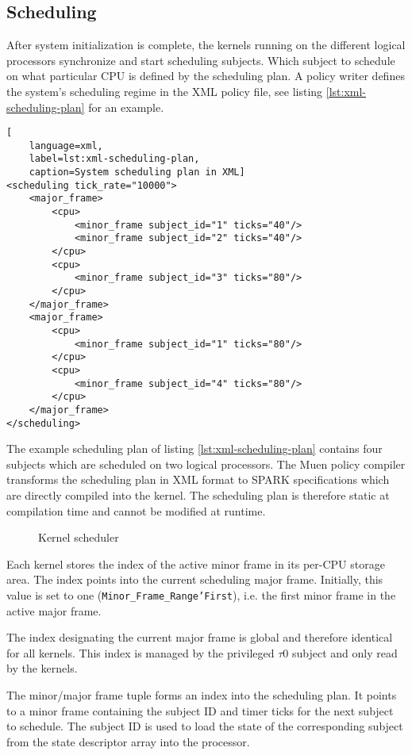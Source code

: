 \subsection{Scheduling}\label{subsec:scheduling}
After system initialization is complete, the kernels running on the different
logical processors synchronize and start scheduling subjects. Which subject to
schedule on what particular CPU is defined by the scheduling plan. A policy
writer defines the system's scheduling regime in the XML policy file, see
listing \ref{lst:xml-scheduling-plan} for an example.

\begin{lstlisting}[
	language=xml,
	label=lst:xml-scheduling-plan,
	caption=System scheduling plan in XML]
<scheduling tick_rate="10000">
	<major_frame>
		<cpu>
			<minor_frame subject_id="1" ticks="40"/>
			<minor_frame subject_id="2" ticks="40"/>
		</cpu>
		<cpu>
			<minor_frame subject_id="3" ticks="80"/>
		</cpu>
	</major_frame>
	<major_frame>
		<cpu>
			<minor_frame subject_id="1" ticks="80"/>
		</cpu>
		<cpu>
			<minor_frame subject_id="4" ticks="80"/>
		</cpu>
	</major_frame>
</scheduling>
\end{lstlisting}

The example scheduling plan of listing \ref{lst:xml-scheduling-plan} contains
four subjects which are scheduled on two logical processors. The Muen policy
compiler transforms the scheduling plan in XML format to SPARK specifications
which are directly compiled into the kernel. The scheduling plan is therefore
static at compilation time and cannot be modified at runtime.

\begin{figure}[h]
	\centering
	
	\caption{Kernel scheduler}
	\label{fig:kernel-scheduler}
\end{figure}

Each kernel stores the index of the active minor frame in its per-CPU storage
area. The index points into the current scheduling major frame. Initially, this
value is set to one (\texttt{Minor\_Frame\_Range'First}), i.e. the first minor
frame in the active major frame.

The index designating the current major frame is global and therefore identical
for all kernels. This index is managed by the privileged $\tau$0 subject and
only read by the kernels.

The minor/major frame tuple forms an index into the scheduling plan. It points
to a minor frame containing the subject ID and timer ticks for the next subject
to schedule. The subject ID is used to load the state of the corresponding
subject from the state descriptor array into the processor.

